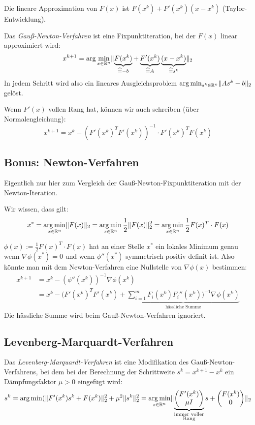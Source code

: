 \documentclass[a4paper,parskip=half*,DIV=15,fontsize=11pt]{scrartcl}
\DeclarePairedDelimiter\norm{\lVert}{\rVert}
\DeclareMathOperator*\argmin{arg\,min}
\newcommand{\grad}{\nabla}
\begin{document}
Die lineare Approximation von $F(x)$ ist $F(x^k) + F'(x^k)(x-x^k)$ (Taylor-Entwicklung).

Das \emph{Gauß-Newton-Verfahren} ist eine Fixpunktiteration, bei der $F(x)$ linear approximiert wird:
\[ x^{k+1} = \arg \min_{x \in \mathbb{R}^n} \norm{ \underbrace{F(x^k)}_{\widehat{=} -b} + \underbrace{F'(x^k)}_{\widehat{=} A} \underbrace{(x-x^k)}_{\widehat{=} s^k} }_2 \]
In jedem Schritt wird also ein lineares Ausgleichsproblem $\arg\min_{s^k \in \mathbb{R}^n} \norm{A s^k - b}_2$ gelöst.

Wenn $F'(x)$ vollen Rang hat, können wir auch schreiben (über Normalengleichung):
\[ x^{k+1} = x^k - (F'(x^k)^T F'(x^k))^{-1} \cdot F'(x^k)^T F(x^k) \]

\subsection{Bonus: Newton-Verfahren}

Eigentlich nur hier zum Vergleich der Gauß-Newton-Fixpunktiteration mit der Newton-Iteration.

Wir wissen, dass gilt:
\[ x^\ast = \argmin_{x \in \mathbb{R}^n} \norm{F(x)}_2 = \argmin_{x \in \mathbb{R}^n} \frac{1}{2} \norm{F(x)}_2^2 = \argmin_{x \in \mathbb{R}^n} \frac{1}{2} F(x)^T \cdot F(x) \]

$\phi(x) := \frac{1}{2} F(x)^T \cdot F(x)$ hat an einer Stelle $x^\ast$ ein lokales Minimum genau wenn $\grad\phi(x^\ast) = 0$ und wenn $\phi''(x^\ast)$ symmetrisch positiv definit ist.
Also könnte man mit dem Newton-Verfahren eine Nullstelle von $\grad \phi(x)$ bestimmen:
\begin{align*}
  x^{k+1} &= x^k - (\phi''(x^k))^{-1} \grad \phi(x^k) \\
          &= x^k - (F'(x^k)^T F'(x^k) + \underbrace{\sum_{i=1}^m F_i(x^k) F_i''(x^k))^{-1} \grad \phi(x^k)}_\text{hässliche Summe}
\end{align*}
Die hässliche Summe wird beim Gauß-Newton-Verfahren ignoriert.

\subsection{Levenberg-Marquardt-Verfahren}

Das \emph{Levenberg-Marquardt-Verfahren} ist eine Modifikation des Gauß-Newton-Verfahrens, bei dem bei der Berechnung der Schrittweite $s^k = x^{k+1} - x^k$ ein Dämpfungsfaktor $\mu > 0$ eingefügt wird:
\[ s^k = \argmin (\norm{F'(x^k)s^k + F(x^k)}^2_2 + \mu^2 \norm{s^k}^2_2 = \argmin_{s \in \mathbb{R}^n} \norm{\underbrace{\begin{pmatrix} F'(x^k) \\ \mu I \end{pmatrix}}_{\substack{\text{immer voller}\\\text{Rang}}} s + \begin{pmatrix} F(x^k) \\ 0 \end{pmatrix}}_2 \]
\end{document}
